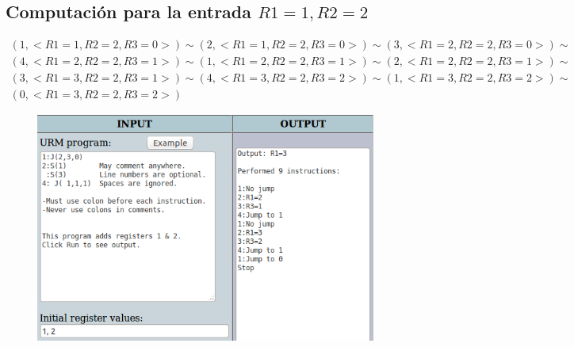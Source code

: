		\subsection{Computación para la entrada $R1=1, R2=2$}
		\begin{equation*}\begin{gathered}
		(1, <R1=1, R2=2, R3=0>) \sim (2, <R1=1, R2=2, R3=0>) \sim (3, <R1=2, R2=2, R3=0>) \sim\\
		(4, <R1=2, R2=2, R3=1>) \sim (1, <R1=2, R2=2, R3=1>) \sim (2, <R1=2, R2=2, R3=1>) \sim\\
		(3, <R1=3, R2=2, R3=1>) \sim (4, <R1=3, R2=2, R3=2>) \sim (1, <R1=3, R2=2, R3=2>) \sim\\
		(0, <R1=3, R2=2, R3=2>)
		\end{gathered}\end{equation*}
		\begin{figure}[H]
  			\centering
  			\includegraphics[scale=0.5]{images/112.png}
  		\end{figure}
